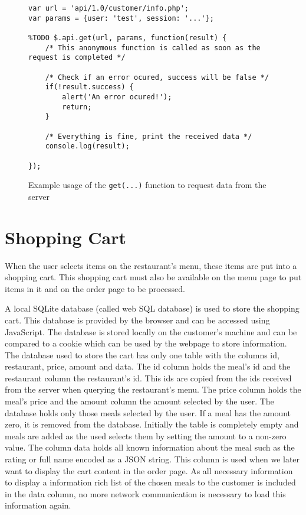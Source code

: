 \begin{figure}
\lstset{language=javascript}
\begin{lstlisting}
var url = 'api/1.0/customer/info.php';
var params = {user: 'test', session: '...'};

%TODO $.api.get(url, params, function(result) {
    /* This anonymous function is called as soon as the request is completed */
    
    /* Check if an error ocured, success will be false */
    if(!result.success) {
        alert('An error ocured!');
        return;
    }
    
    /* Everything is fine, print the received data */
    console.log(result);
    
});
\end{lstlisting}
\caption{Example usage of the \texttt{get(...)} function to request data from the server}
\label{api_example}
\end{figure}

\section{Shopping Cart}
When the user selects items on the restaurant's menu, these items are put into a shopping cart. This shopping cart must also be available on the menu page to put items in it and on the order page to be processed. 

A local SQLite database (called web SQL database) is used to store the shopping cart. This database is provided by the browser and can be accessed using JavaScript. The database is stored locally on the customer's machine and can be compared to a cookie which can be used by the webpage to store information. The database used to store the cart has only one table with the columns id, restaurant, price, amount and data. The id column holds the meal's id and the restaurant column the restaurant's id. This ids are copied from the ids received from the server when querying the restaurant's menu. The price column holds the meal's price and the amount column the amount selected by the user. The database holds only those meals selected by the user. If a meal has the amount zero, it is removed from the database. Initially the table is completely empty and meals are added as the used selects them by setting the amount to a non-zero value. The column data holds all known information about the meal such as the rating or full name encoded as a JSON string. This column is used when we later want to display the cart content in the order page. As all necessary information to display a information rich list of the chosen meals to the customer is included in the data column, no more network communication is necessary to load this information again.

